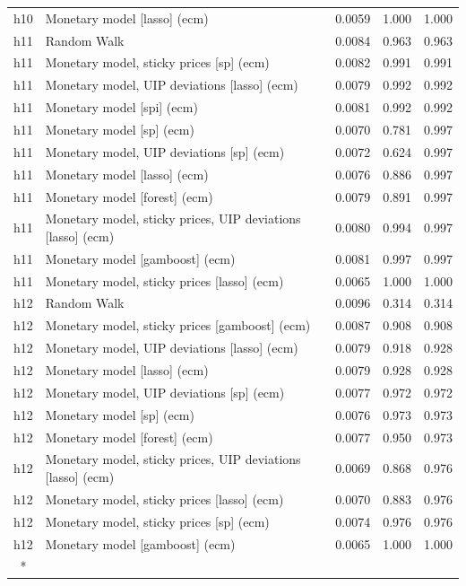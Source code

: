 \begin{ThreePartTable}
\begin{longtable}[t]{cp{5.5cm}ccc}
h10 & \raggedright Monetary model [lasso] (ecm) & 0.0059 & 1.000 & 1.000\\
\addlinespace
h11 & \raggedright Random Walk & 0.0084 & 0.963 & 0.963\\
h11 & \raggedright Monetary model, sticky prices [sp] (ecm) & 0.0082 & 0.991 & 0.991\\
h11 & \raggedright Monetary model, UIP deviations [lasso] (ecm) & 0.0079 & 0.992 & 0.992\\
h11 & \raggedright Monetary model [spi] (ecm) & 0.0081 & 0.992 & 0.992\\
h11 & \raggedright Monetary model [sp] (ecm) & 0.0070 & 0.781 & 0.997\\
h11 & \raggedright Monetary model, UIP deviations [sp] (ecm) & 0.0072 & 0.624 & 0.997\\
h11 & \raggedright Monetary model [lasso] (ecm) & 0.0076 & 0.886 & 0.997\\
h11 & \raggedright Monetary model [forest] (ecm) & 0.0079 & 0.891 & 0.997\\
h11 & \raggedright Monetary model, sticky prices, UIP deviations [lasso] (ecm) & 0.0080 & 0.994 & 0.997\\
h11 & \raggedright Monetary model [gamboost] (ecm) & 0.0081 & 0.997 & 0.997\\
h11 & \raggedright Monetary model, sticky prices [lasso] (ecm) & 0.0065 & 1.000 & 1.000\\
\addlinespace
h12 & \raggedright Random Walk & 0.0096 & 0.314 & 0.314\\
h12 & \raggedright Monetary model, sticky prices [gamboost] (ecm) & 0.0087 & 0.908 & 0.908\\
h12 & \raggedright Monetary model, UIP deviations [lasso] (ecm) & 0.0079 & 0.918 & 0.928\\
h12 & \raggedright Monetary model [lasso] (ecm) & 0.0079 & 0.928 & 0.928\\
h12 & \raggedright Monetary model, UIP deviations [sp] (ecm) & 0.0077 & 0.972 & 0.972\\
h12 & \raggedright Monetary model [sp] (ecm) & 0.0076 & 0.973 & 0.973\\
h12 & \raggedright Monetary model [forest] (ecm) & 0.0077 & 0.950 & 0.973\\
h12 & \raggedright Monetary model, sticky prices, UIP deviations [lasso] (ecm) & 0.0069 & 0.868 & 0.976\\
h12 & \raggedright Monetary model, sticky prices [lasso] (ecm) & 0.0070 & 0.883 & 0.976\\
h12 & \raggedright Monetary model, sticky prices [sp] (ecm) & 0.0074 & 0.976 & 0.976\\
h12 & \raggedright Monetary model [gamboost] (ecm) & 0.0065 & 1.000 & 1.000\\*
\end{longtable}
\end{ThreePartTable}
\endgroup{}
